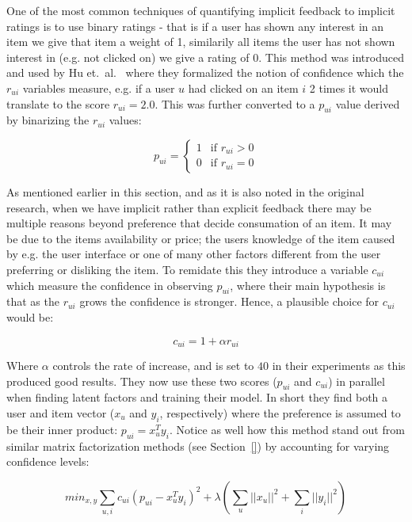 One of the most common techniques of quantifying implicit feedback to implicit
ratings is to use binary ratings - that is if a user has shown any interest in
an item we give that item a weight of 1, similarily all items the user has not
shown interest in (e.g. not clicked on) we give a rating of 0. This method was
introduced and used by Hu et.\ al.~\cite{Hu2008} where they formalized the
notion of confidence which the $r_{ui}$ variables measure, e.g. if a user $u$
had clicked on an item $i$ 2 times it would translate to the score $r_{ui} =
2.0$. This was further converted to a $p_{ui}$ value derived by binarizing the
$r_{ui}$ values:

\begin{equation}
  p_{ui} =
  \begin{cases}
    1 & \text{if $r_{ui} > 0$} \\
    0 & \text{if $r_{ui} = 0$}
  \end{cases}
\end{equation}

As mentioned earlier in this section, and as it is also noted in the original
research, when we have implicit rather than explicit feedback there may be
multiple reasons beyond preference that decide consumation of an item. It may
be due to the items availability or price; the users knowledge of the item
caused by e.g. the user interface or one of many other factors different from
the user preferring or disliking the item. To remidate this they introduce a
variable $c_{ui}$ which measure the confidence in observing $p_{ui}$, where
their main hypothesis is that as the $r_{ui}$ grows the confidence is stronger.
Hence, a plausible choice for $c_{ui}$ would be:

\begin{equation}
c_{ui} = 1 + \alpha r_{ui}
\end{equation}

Where $\alpha$ controls the rate of increase, and is set to $40$ in their
experiments as this produced good results. They now use these two scores
($p_{ui}$ and $c_{ui}$) in parallel when finding latent factors and training
their model. In short they find both a user and item vector ($x_u$ and $y_i$,
respectively) where the preference is assumed to be their inner product: $p_{ui}
= x_{u}^{T} y_{i}$. Notice as well how this method stand out from similar
matrix factorization methods (see Section~\ref{}) by accounting for varying
confidence levels:

\begin{equation}
  min_{x,y} \sum _{u,i} c_{ui} (p_{ui} - x_{u}^{T} y_i)^2 + \lambda (\sum _{u}
  || x_u ||^2 + \sum_{i} || y_i ||^2)
\end{equation}

